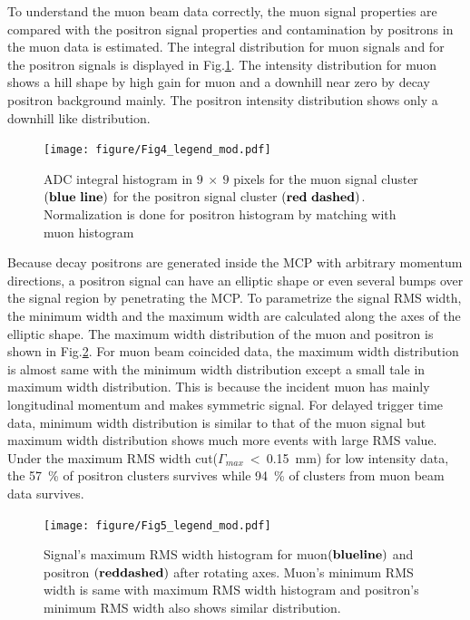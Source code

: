 \documentclass[preprint,3p,twocolumn]{elsarticle}
\begin{document}
To understand the muon beam data correctly, the muon signal properties are compared with the positron signal properties and contamination by positrons in the muon data is estimated. The integral distribution for muon signals and for the positron signals is displayed in Fig.\ref{fig:BPM_int}.
The intensity distribution for muon shows a hill shape by high gain for muon and a downhill near zero by decay positron background mainly.
The positron intensity distribution shows only a downhill like distribution.

\begin{figure}[htb]
\begin{minipage}[t]{60mm}
\texttt{[image: figure/Fig4\_legend\_mod.pdf]} %
\end{minipage}
\caption{ADC integral histogram in $9~\times~9$ pixels for the muon signal cluster $\bf (blue\ line)$ for the positron signal cluster $\bf (red\ dashed)$.
Normalization is done for positron histogram by matching with muon histogram}
\vspace{-0.2cm}
\label{fig:BPM_int}
\end{figure}

Because decay positrons are generated inside the MCP with arbitrary momentum directions, a positron signal can have an elliptic shape or even several bumps over the signal region by penetrating the MCP.
To parametrize the signal RMS width, the minimum width and the maximum width are calculated along the axes of the elliptic shape. %
The maximum width distribution of the muon and positron is shown in Fig.\ref{fig:positron_width}.
For muon beam coincided data, the maximum width distribution is almost same with the minimum width distribution except a small tale in maximum width distribution. This is because the incident muon has mainly longitudinal momentum and makes symmetric signal.
For delayed trigger time data, minimum width distribution is similar to that of the muon signal but maximum width distribution shows much more events with large RMS value. Under the maximum RMS width cut($\Gamma_{max}~<~$\SI{0.15}{\mm}) for low intensity data, the \SI{57}{\percent} of positron clusters survives while \SI{94}{\percent} of clusters from muon beam data survives.

\begin{figure}[htb]
\begin{minipage}[t]{60mm}
\texttt{[image: figure/Fig5\_legend\_mod.pdf]}
\end{minipage}
\caption{Signal's maximum RMS width histogram for muon$\bf (blue line)$ and positron $\bf (red dashed)$ after rotating axes. 
Muon's minimum RMS width is same with maximum RMS width histogram and positron's minimum RMS width also shows similar distribution.}\vspace{-0.3cm}
\label{fig:positron_width}
\end{figure}
\end{document}
